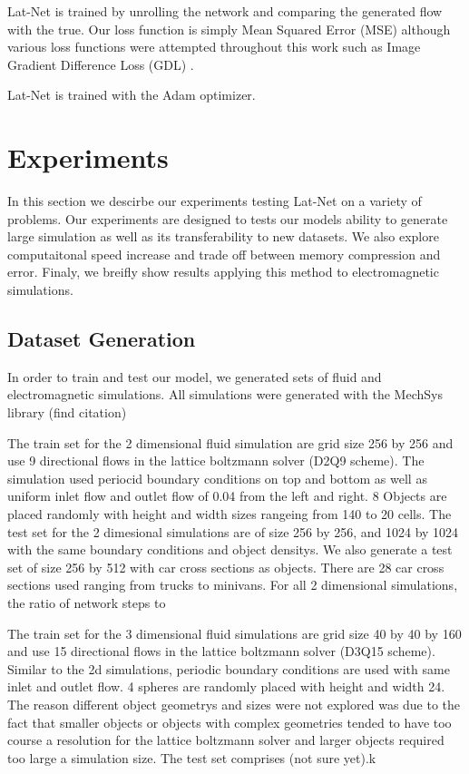 \documentclass{article}
\begin{document}
Lat-Net is trained by unrolling the network and comparing the generated flow with the true. Our loss function is simply Mean Squared Error (MSE) although various loss functions were attempted throughout this work such as Image Gradient Difference Loss (GDL) \cite{mathieu2015deep}.  

Lat-Net is trained with the Adam optimizer\cite{kingma2014adam}.

\section{Experiments}

In this section we descirbe our experiments testing Lat-Net on a variety of problems. Our experiments are designed to tests our models ability to generate large simulation as well as its transferability to new datasets. We also explore computaitonal speed increase and trade off between memory compression and error. Finaly, we breifly show results applying this method to electromagnetic simulations.

\subsection{Dataset Generation}
In order to train and test our model, we generated sets of fluid and electromagnetic simulations. All simulations were generated with the MechSys library (find citation)

The train set for the 2 dimensional fluid simulation are grid size 256 by 256 and use 9 directional flows in the lattice boltzmann solver (D2Q9 scheme)\cite{guo2013lattice}. The simulation used periocid boundary conditions on top and bottom as well as uniform inlet flow and outlet flow of 0.04 from the left and right. 8 Objects are placed randomly with height and width sizes rangeing from 140 to 20 cells. The test set for the 2 dimesional simulations are of size 256 by 256, and 1024 by 1024 with the same boundary conditions and object densitys. We also generate a test set of size 256 by 512 with car cross sections as objects. There are 28 car cross sections used ranging from trucks to minivans. For all 2 dimensional simulations, the ratio of network steps to 

The train set for the 3 dimensional fluid simulations are grid size 40 by 40 by 160 and use 15 directional flows in the lattice boltzmann solver (D3Q15 scheme)\cite{guo2013lattice}. Similar to the 2d simulations, periodic boundary conditions are used with same inlet and outlet flow. 4 spheres are randomly placed with height and width 24. The reason different object geometrys and sizes were not explored was due to the fact that smaller objects or objects with complex geometries tended to have too course a resolution for the lattice boltzmann solver and larger objects required too large a simulation size. The test set comprises (not sure yet).k
\end{document}
